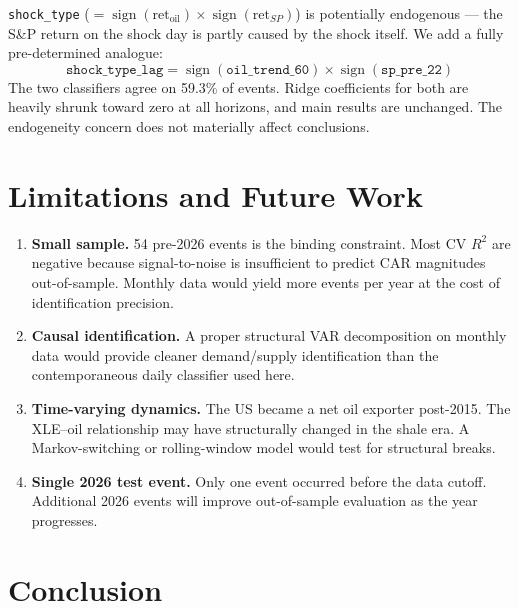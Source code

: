 \documentclass[11pt,a4paper]{article}
\begin{document}
\texttt{shock\_type} ($= \operatorname{sign}(\text{ret}_{\text{oil}}) \times \operatorname{sign}(\text{ret}_{SP})$) is potentially endogenous — the S\&P return on the shock day is partly caused by the shock itself. We add a fully pre-determined analogue:
\[
\texttt{shock\_type\_lag} = \operatorname{sign}(\texttt{oil\_trend\_60}) \times \operatorname{sign}(\texttt{sp\_pre\_22})
\]
The two classifiers agree on 59.3\% of events. Ridge coefficients for both are heavily shrunk toward zero at all horizons, and main results are unchanged. The endogeneity concern does not materially affect conclusions.

\section{Limitations and Future Work}

\begin{enumerate}[noitemsep]
  \item \textbf{Small sample.} 54 pre-2026 events is the binding constraint. Most CV $R^2$ are negative because signal-to-noise is insufficient to predict CAR magnitudes out-of-sample. Monthly data would yield more events per year at the cost of identification precision.

  \item \textbf{Causal identification.} A proper structural VAR decomposition \cite{kilian2009} on monthly data would provide cleaner demand/supply identification than the contemporaneous daily classifier used here.

  \item \textbf{Time-varying dynamics.} The US became a net oil exporter post-2015. The XLE--oil relationship may have structurally changed in the shale era. A Markov-switching or rolling-window model would test for structural breaks.

  \item \textbf{Single 2026 test event.} Only one event occurred before the data cutoff. Additional 2026 events will improve out-of-sample evaluation as the year progresses.
\end{enumerate}

\section{Conclusion}
\end{document}
